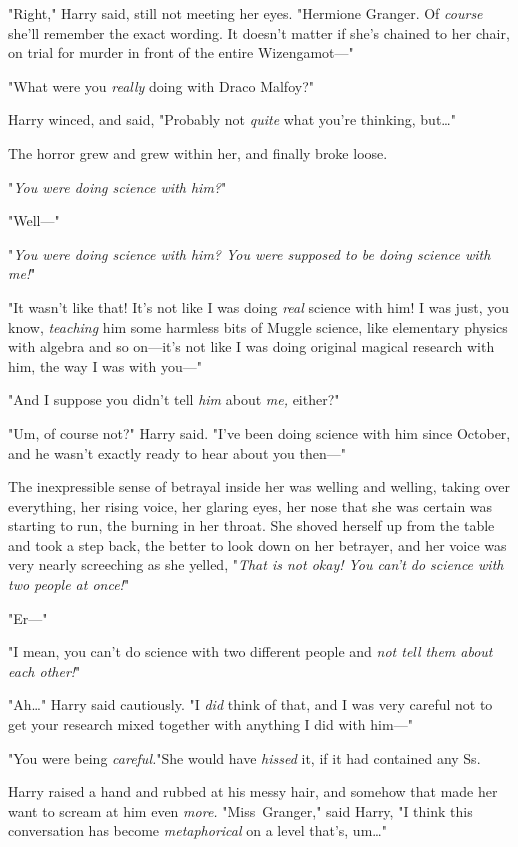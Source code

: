 "Right," Harry said, still not meeting her eyes. "Hermione Granger. Of
\emph{course} she’ll remember the exact wording. It doesn’t matter if she’s
chained to her chair, on trial for murder in front of the entire Wizengamot—"

"What were you \emph{really} doing with Draco Malfoy?"

Harry winced, and said, "Probably not \emph{quite} what you’re thinking,
but…"

The horror grew and grew within her, and finally broke loose.

"\emph{You were doing \emph{science} with him?}"

"Well—"

"\emph{You were doing \emph{science} with him? You were supposed to be doing science
with \emph{me}!}"

"It wasn’t like that! It’s not like I was doing \emph{real} science with him! I
was just, you know, \emph{teaching} him some harmless bits of Muggle science,
like elementary physics with algebra and so on—it’s not like I was doing
original magical research with him, the way I was with you—"

"And I suppose you didn’t tell \emph{him} about \emph{me,} either?"

"Um, of course not?" Harry said. "I’ve been doing science with him since
October, and he wasn’t exactly ready to hear about you then—"

The inexpressible sense of betrayal inside her was welling and welling, taking
over everything, her rising voice, her glaring eyes, her nose that she was
certain was starting to run, the burning in her throat. She shoved herself up
from the table and took a step back, the better to look down on her betrayer,
and her voice was very nearly screeching as she yelled, "\emph{That is not
okay! You can’t do science with two people at once!}"

"Er—"

"I mean, you can’t do science with two different people and \emph{not tell them
about each other!}"

"Ah…" Harry said cautiously. "I \emph{did} think of that, and I was very
careful not to get your research mixed together with anything I did with him—"

"You were being \emph{careful.}"She would have \emph{hissed} it, if it had
contained any Ss.

Harry raised a hand and rubbed at his messy hair, and somehow that made her
want to scream at him even \emph{more.} "Miss~Granger," said Harry, "I think
this conversation has become \emph{metaphorical} on a level that’s, um…"

